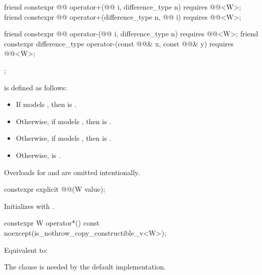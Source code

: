 \begin{codeblock}
{{    friend constexpr @@ operator+(@@ i, difference_type n)
      requires @@<W>;
    friend constexpr @@ operator+(difference_type n, @@ i)
      requires @@<W>;

    friend constexpr @@ operator-(@@ i, difference_type n)
      requires @@<W>;
    friend constexpr difference_type operator-(const @@& x, const @@& y)
      requires @@<W>;
  };
}
\end{codeblock}

\pnum
{} is defined as follows:
\begin{itemize}
\item If  models , then
 is .
\item Otherwise, if  models , then
 is .
\item Otherwise, if  models , then
 is .
\item Otherwise,  is .
\end{itemize}

\pnum
\begin{note}
Overloads for  and  are omitted intentionally.
\end{note}

\begin{itemdecl}
constexpr explicit @@(W value);
\end{itemdecl}

\begin{itemdescr}
\pnum
\effects
Initializes  with .
\end{itemdescr}

\begin{itemdecl}
constexpr W operator*() const noexcept(is_nothrow_copy_constructible_v<W>);
\end{itemdecl}

\begin{itemdescr}
\pnum
\effects
Equivalent to: 

\pnum
\begin{note}
The  clause is needed by the default 
implementation.
\end{note}
\end{itemdescr}

